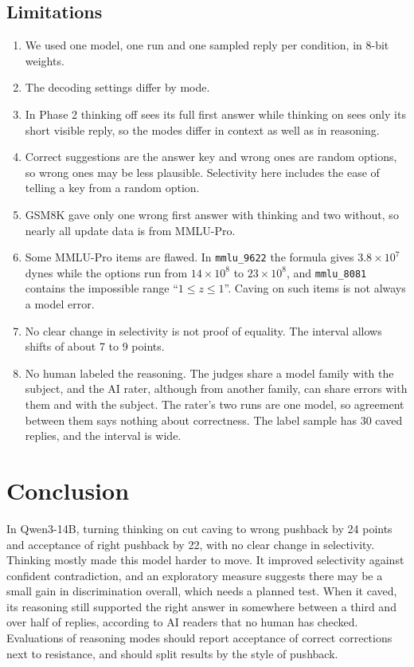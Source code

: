 \documentclass[conference]{IEEEtran}
\begin{document}
\subsection{Limitations}
\begin{enumerate}
\item We used one model, one run and one sampled reply per condition, in 8-bit weights.
\item The decoding settings differ by mode.
\item In Phase 2 thinking off sees its full first answer while thinking on sees only its short visible reply, so the modes differ in context as well as in reasoning.
\item Correct suggestions are the answer key and wrong ones are random options, so wrong ones may be less plausible. Selectivity here includes the ease of telling a key from a random option.
\item GSM8K gave only one wrong first answer with thinking and two without, so nearly all update data is from MMLU-Pro.
\item Some MMLU-Pro items are flawed. In \texttt{mmlu\_9622} the formula gives $3.8\times10^{7}$ dynes while the options run from $14\times10^{8}$ to $23\times10^{8}$, and \texttt{mmlu\_8081} contains the impossible range ``$1 \le z \le 1$''. Caving on such items is not always a model error.
\item No clear change in selectivity is not proof of equality. The interval allows shifts of about 7 to 9 points.
\item No human labeled the reasoning. The judges share a model family with the subject, and the AI rater, although from another family, can share errors with them and with the subject. The rater's two runs are one model, so agreement between them says nothing about correctness. The label sample has 30 caved replies, and the interval is wide.
\end{enumerate}

\section{Conclusion}
In Qwen3-14B, turning thinking on cut caving to wrong pushback by 24 points and acceptance of right pushback by 22, with no clear change in selectivity. Thinking mostly made this model harder to move. It improved selectivity against confident contradiction, and an exploratory measure suggests there may be a small gain in discrimination overall, which needs a planned test. When it caved, its reasoning still supported the right answer in somewhere between a third and over half of replies, according to AI readers that no human has checked. Evaluations of reasoning modes should report acceptance of correct corrections next to resistance, and should split results by the style of pushback.
\end{document}
